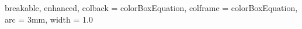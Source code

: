 {
  breakable,
  enhanced,
  colback  = colorBoxEquation,
  colframe = colorBoxEquation,
  arc      = 3mm,
  width    = 1.0 \linewidth
}



